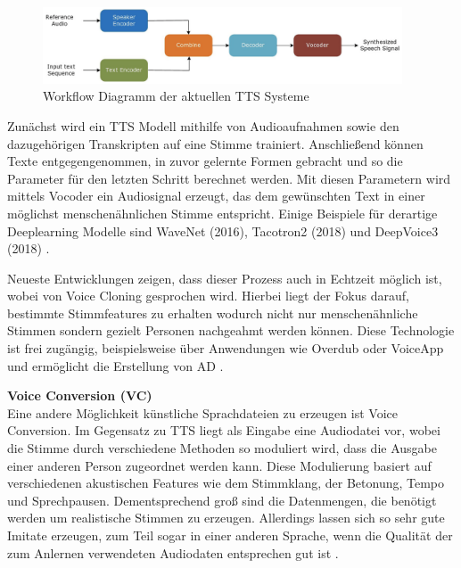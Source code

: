 \begin{figure}[htp]
\begin{center}
  \includegraphics[width=0.95\textwidth]{assets/TTS.png}
  \caption[labelInTOC]{Workflow Diagramm der aktuellen TTS Systeme \citep[][]{Masood2022}}
  \label{fig:tts}
\end{center}
\end{figure}

Zunächst wird ein TTS Modell mithilfe von Audioaufnahmen sowie den dazugehörigen Transkripten auf eine Stimme trainiert.
Anschließend können Texte entgegengenommen, in zuvor gelernte Formen gebracht und so die Parameter für den letzten Schritt berechnet werden.
Mit diesen Parametern wird mittels Vocoder ein Audiosignal erzeugt, das dem gewünschten Text in einer möglichst menschenähnlichen Stimme entspricht.
Einige Beispiele für derartige Deeplearning Modelle sind WaveNet (2016), Tacotron2 (2018) und DeepVoice3 (2018) \citep[vgl.][]{Almutairi2022}.

Neueste Entwicklungen zeigen, dass dieser Prozess auch in Echtzeit möglich ist, wobei von Voice Cloning gesprochen wird.
Hierbei liegt der Fokus darauf, bestimmte Stimmfeatures zu erhalten wodurch nicht nur menschenähnliche Stimmen sondern gezielt Personen nachgeahmt werden können.
Diese Technologie ist frei zugängig, beispielsweise über Anwendungen wie Overdub oder VoiceApp und ermöglicht die Erstellung von AD \citep[][]{Masood2022}.

\textbf{Voice Conversion (VC)}\\
Eine andere Möglichkeit künstliche Sprachdateien zu erzeugen ist Voice Conversion.
Im Gegensatz zu TTS liegt als Eingabe eine Audiodatei vor, wobei die Stimme durch verschiedene Methoden so moduliert wird, dass die Ausgabe einer anderen Person zugeordnet werden kann.
Diese Modulierung basiert auf verschiedenen akustischen Features wie dem Stimmklang, der Betonung, Tempo und Sprechpausen.
Dementsprechend groß sind die Datenmengen, die benötigt werden um realistische Stimmen zu erzeugen.
Allerdings lassen sich so sehr gute Imitate erzeugen, zum Teil sogar in einer anderen Sprache, wenn die Qualität der zum Anlernen verwendeten Audiodaten entsprechen gut ist \citep[][]{Masood2022}.

